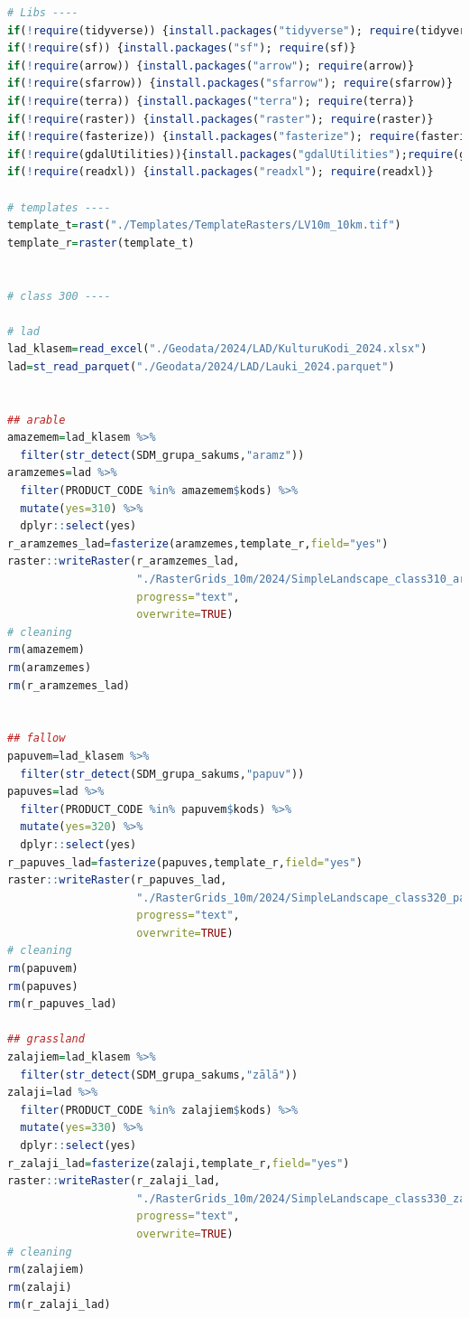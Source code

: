 \documentclass[
]{book}
\begin{document}
\begin{lstlisting}[language=R]
# Libs ----
if(!require(tidyverse)) {install.packages("tidyverse"); require(tidyverse)}
if(!require(sf)) {install.packages("sf"); require(sf)}
if(!require(arrow)) {install.packages("arrow"); require(arrow)}
if(!require(sfarrow)) {install.packages("sfarrow"); require(sfarrow)}
if(!require(terra)) {install.packages("terra"); require(terra)}
if(!require(raster)) {install.packages("raster"); require(raster)}
if(!require(fasterize)) {install.packages("fasterize"); require(fasterize)}
if(!require(gdalUtilities)){install.packages("gdalUtilities");require(gdalUtilities)}
if(!require(readxl)) {install.packages("readxl"); require(readxl)}

# templates ----
template_t=rast("./Templates/TemplateRasters/LV10m_10km.tif")
template_r=raster(template_t)


# class 300 ----

# lad
lad_klasem=read_excel("./Geodata/2024/LAD/KulturuKodi_2024.xlsx")
lad=st_read_parquet("./Geodata/2024/LAD/Lauki_2024.parquet")


## arable
amazemem=lad_klasem %>% 
  filter(str_detect(SDM_grupa_sakums,"aramz"))
aramzemes=lad %>% 
  filter(PRODUCT_CODE %in% amazemem$kods) %>% 
  mutate(yes=310) %>% 
  dplyr::select(yes)
r_aramzemes_lad=fasterize(aramzemes,template_r,field="yes")
raster::writeRaster(r_aramzemes_lad,
                    "./RasterGrids_10m/2024/SimpleLandscape_class310_aramzemes_lad.tif",
                    progress="text",
                    overwrite=TRUE)
# cleaning
rm(amazemem)
rm(aramzemes)
rm(r_aramzemes_lad)


## fallow
papuvem=lad_klasem %>% 
  filter(str_detect(SDM_grupa_sakums,"papuv"))
papuves=lad %>% 
  filter(PRODUCT_CODE %in% papuvem$kods) %>% 
  mutate(yes=320) %>% 
  dplyr::select(yes)
r_papuves_lad=fasterize(papuves,template_r,field="yes")
raster::writeRaster(r_papuves_lad,
                    "./RasterGrids_10m/2024/SimpleLandscape_class320_papuves_lad.tif",
                    progress="text",
                    overwrite=TRUE)
# cleaning
rm(papuvem)
rm(papuves)
rm(r_papuves_lad)

## grassland
zalajiem=lad_klasem %>% 
  filter(str_detect(SDM_grupa_sakums,"zālā"))
zalaji=lad %>% 
  filter(PRODUCT_CODE %in% zalajiem$kods) %>% 
  mutate(yes=330) %>% 
  dplyr::select(yes)
r_zalaji_lad=fasterize(zalaji,template_r,field="yes")
raster::writeRaster(r_zalaji_lad,
                    "./RasterGrids_10m/2024/SimpleLandscape_class330_zalaji_lad.tif",
                    progress="text",
                    overwrite=TRUE)
# cleaning
rm(zalajiem)
rm(zalaji)
rm(r_zalaji_lad)


\end{lstlisting}
\end{document}
